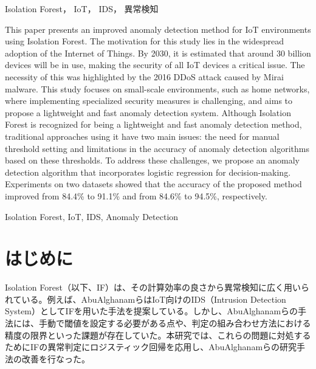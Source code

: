 \documentclass{css}
\begin{document}

\begin{jkeyword}
Isolation Forest， IoT， IDS， 異常検知
\end{jkeyword}

\begin{eabstract}
    This paper presents an improved anomaly detection method for IoT environments using Isolation Forest. The motivation for this study lies in the widespread adoption of the Internet of Things. By 2030, it is estimated that around 30 billion devices will be in use, making the security of all IoT devices a critical issue. The necessity of this was highlighted by the 2016 DDoS attack caused by Mirai malware. This study focuses on small-scale environments, such as home networks, where implementing specialized security measures is challenging, and aims to propose a lightweight and fast anomaly detection system. Although Isolation Forest is recognized for being a lightweight and fast anomaly detection method, traditional approaches using it have two main issues: the need for manual threshold setting and limitations in the accuracy of anomaly detection algorithms based on these thresholds. To address these challenges, we propose an anomaly detection algorithm that incorporates logistic regression for decision-making. Experiments on two datasets showed that the accuracy of the proposed method improved from 84.4\% to 91.1\% and from 84.6\% to 94.5\%, respectively.
\end{eabstract}


\begin{ekeyword}
Isolation Forest, IoT, IDS, Anomaly Detection
\end{ekeyword}


\maketitle

\section{はじめに}
Isolation Forest（以下、IF）は、その計算効率の良さから異常検知に広く用いられている。例えば、AbuAlghanamらはIoT向けのIDS（Intrusion Detection System）としてIFを用いた手法を提案している\cite{AbuAlghanam2023-sx}。しかし、AbuAlghanamらの手法には、手動で閾値を設定する必要がある点や、判定の組み合わせ方法における精度の限界といった課題が存在していた。本研究では、これらの問題に対処するためにIFの異常判定にロジスティック回帰を応用し、AbuAlghanamらの研究手法の改善を行なった。
\end{document}
